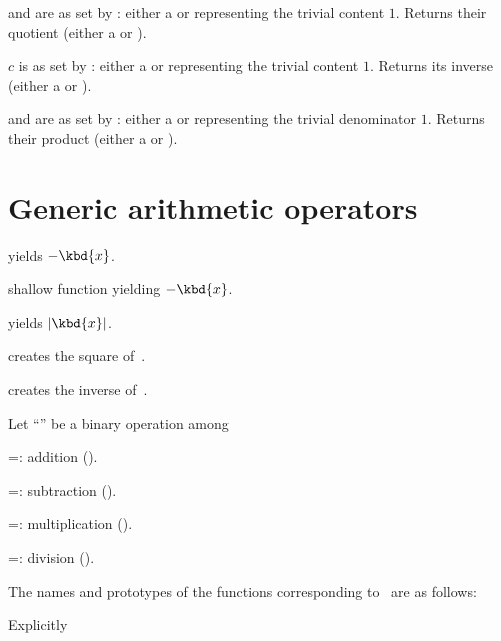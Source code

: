    and  are
as set by : either a  or 
representing the trivial content $1$. Returns their quotient (either a
 or ).

 $c$ is as set by : either
a  or  representing the trivial content $1$. Returns its
inverse (either a  or ).

  and  are
as set by : either a  or  representing
the trivial denominator $1$. Returns their product (either a  or
).

\section{Generic arithmetic operators}


 yields $-\kbd{x}$.

 shallow function yielding $-\kbd{x}$.

 yields $|\kbd{x}|$.

 creates the square of~.

 creates the inverse of~.


Let ``\op'' be a binary operation among

\op=: addition ().

\op=: subtraction ().

\op=: multiplication ().

\op=: division ().

\noindent The names and prototypes of the functions corresponding
to \op\ are as follows:






\noindent Explicitly


